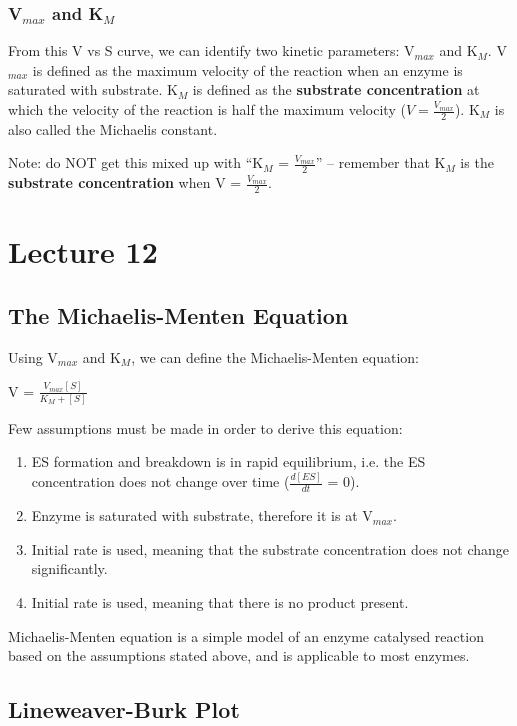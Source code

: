 \documentclass[a4paper, 12pt]{report}
\newcommand{\mychapter}[2]{
    \setcounter{chapter}{#1}
    \setcounter{section}{0}
    \chapter*{#2}
    \addcontentsline{toc}{chapter}{#2}
}
\begin{document}
\subsection{V$_{max}$ and K$_M$}

From this V vs S curve, we can identify two kinetic parameters: V$_{max}$ and K$_M$.
V$_{max}$ is defined as the maximum velocity of the reaction when an enzyme is saturated with substrate.
K$_M$ is defined as the \textbf{substrate concentration} at which the velocity of the reaction is half the maximum velocity ($V = \frac{V_{max}}{2}$).
K$_M$ is also called the Michaelis constant.

Note: do NOT get this mixed up with ``K$_M$ = $\frac{V_{max}}{2}$'' -- remember that K$_M$ is the \textbf{substrate concentration} when V = $\frac{V_{max}}{2}$.

\mychapter{12}{Lecture 12}

\section{The Michaelis-Menten Equation}

Using V$_{max}$ and K$_M$, we can define the Michaelis-Menten equation:

\begin{center}
\large{V = $\frac{V_{max} [S]}{K_M + [S]}$}
\end{center}

Few assumptions must be made in order to derive this equation:
\begin{center}
\end{center}
\begin{enumerate}
\item ES formation and breakdown is in rapid equilibrium, i.e. the ES concentration does not change over time ({$\frac{d[ES]}{dt}$} = 0).
\item Enzyme is saturated with substrate, therefore it is at V$_{max}$.
\item Initial rate is used, meaning that the substrate concentration does not change significantly.
\item Initial rate is used, meaning that there is no product present.
\end{enumerate}

Michaelis-Menten equation is a simple model of an enzyme catalysed reaction based on the assumptions stated above, and is applicable to most enzymes.

\section{Lineweaver-Burk Plot}
\end{document}
